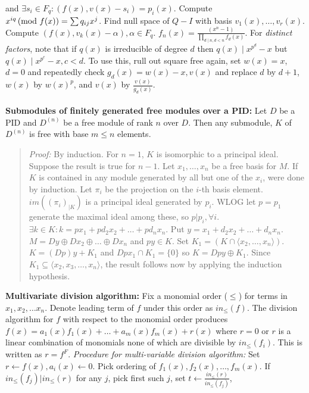 and $\exists s_i \in F_q: (f(x), v(x)-s_i)= p_i(x)$.
Compute $x^{iq} \thinspace \textnormal{(mod } f(x) \textnormal{)}= \sum q_{ij} x^j$.
Find null space of $Q-I$ with basis $v_1 (x) , \ldots , v_r (x)$.
Compute $(f(x), v_k (x) - \alpha ), \alpha \in F_q$.
$f_{n}(x) = {\frac {(x^{n} - 1)} {\prod_{d \mid n, d<n} f_{d}(x)}}$.
For \emph{distinct factors}, note that if $q(x)$ is irreducible of degree $d$ then
$q(x) \mid x^{p^d} -x$ but $q(x) \mid x^{p^c} -x, c<d$.  To use this, rull out square free
again, set $w(x)=x$, $d=0$ and repeatedly check $g_d(x)= w(x)-x, v(x)$ and replace
$d$ by $d+1$,
$w(x)$ by $w(x)^p$, and $v(x)$ by ${\frac {v(x)} {g_d(x)}}$.
\\
\\
{\bf Submodules of finitely generated free modules over a PID:}
Let $D$ be a PID and $D^{(n)}$ be a free module of rank $n$ over $D$.  Then any
submodule, $K$ of $D^{(n)}$ is free with base $m \leq n$ elements.
\begin{quote}
\emph{Proof:}  By induction.  For $n=1$, $K$ is isomorphic to a principal ideal.
Suppose the result is true for $n-1$.  Let
$x_1, \ldots, x_n$ be a free basis for $M$.  
If $K$ is contained in any module generated by all
but one of the $x_i$, were done by induction.  Let $\pi_i$ be the projection on the
$i$-th basis element.  
$im((\pi_i)_{|K})$ is a principal ideal generated by $p_i$.  WLOG let $p=p_1$ generate the
maximal ideal among these, so $p | p_i, \forall i$. 
$\exists k \in K: k= p x_1 + p d_2 x_2 + \ldots + p d_n x_n$.
Put $y= x_1 + d_2 x_2 + \ldots + d_n x_n$.  $M= Dy \oplus D x_2 \oplus \ldots \oplus D x_n$ 
and $py \in K$.
Set $K_1= (K \cap \langle x_2, \ldots, x_n \rangle)$.
$K= (Dp) y + K_1$ and $Dp x_1 \cap K_1= \{0\}$ so $K= Dp y \oplus K_1$.
Since $K_1 \subseteq \langle x_2 , x_3 , \ldots , x_n \rangle$, the result follows now 
by applying the induction hypothesis.
\end{quote}
{\bf Multivariate division algorithm:}
Fix a monomial order ($\leq$) for terms in $x_1, x_2, \ldots x_n$. Denote leading term of
$f$ under this order as $in_{\leq}(f)$.   The division algorithm for $f$
with respect to the monomial order produces
$f(x)= a_1 (x) f_1 (x) + \ldots + a_m (x) f_m (x) + r(x) $
where $r=0$ or $r$ is a linear combination of monomials none of which are
divisible by $in_{\leq}(f_i )$.  This is written as
$r= {f^F}$.  \emph{Procedure for multi-variable division algorithm:} Set
$r \leftarrow f(x), a_i(x) \leftarrow 0$.
Pick ordering of $f_1(x), f_2(x), \ldots , f_m(x)$.
If $in_{\leq}(f_j) | in_{\leq}(r)$ for any $j$, pick first such $j$, set
$t \leftarrow {\frac {in_{\leq}(r)} {in_{\leq}(f_j)}}$,
